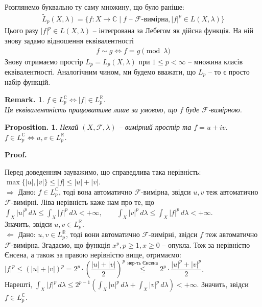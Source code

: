 \documentclass[a4paper, 10pt]{article}
\makeatletter
\def\rightproof{$\boxed{\Rightarrow}$ }
\def\leftproof{$\boxed{\Leftarrow}$ }
\theoremstyle{theoremdd}
\newtheorem*{proposition*}{Proposition.}
\newtheorem*{remark*}{Remark.}
\renewenvironment{proof}[1][Proof.\\]{\par
\pushQED{\hfill \qed}%
\normalfont \topsep6\p@\@plus6\p@\relax
\trivlist
\item\relax
{\bfseries
#1\@addpunct{.}}\hspace\labelsep\ignorespaces
}{%
\popQED\endtrivlist\@endpefalse
}
\makeatother
\begin{document}
\noindent Розглянемо буквально ту саму множину, що було раніше:
\begin{align*}
\tilde{L}_p(X,\lambda) = \{f \colon X \to \mathbb{C} \mid f \text{ -- } \mathcal{F}\text{-вимірна}, |f|^p \in L(X,\lambda)\}
\end{align*}
Цього разу $|f|^p \in L(X,\lambda)$ -- інтегрована за Лебегом як дійсна функція. На ній знову задамо відношення еквівалентності
\begin{align*}
f \sim g \iff f = g \pmod \lambda
\end{align*}
Знову отримаємо простір $L_p = L_p(X,\lambda)$ при $1 \leq p < \infty$ -- множина класів еквівалентності. Аналогічним чином, ми будемо вважати, що $L_p$ -- то є просто набір функцій.

\begin{remark*}
$f \in L_p^{\mathbb{C}} \iff |f| \in L_p^{\mathbb{R}}$.\\
Ця еквівалентність працюватиме лише за умовою, що $f$ буде $\mathcal{F}$-вимірною.
\end{remark*}

\begin{proposition*}
Нехай $(X,\mathcal{F},\lambda)$ -- вимірний простір та $f = u + iv$.\\
$f \in L_p^{\mathbb{C}} \iff u,v \in L_p^{\mathbb{R}}$.
\end{proposition*}

\begin{proof}
Перед доведенням зауважимо, що справедлива така нерівність: $\max\{|u|,|v|\} \leq |f| \leq |u| + |v|$.
\bigskip \\
\rightproof Дано: $f \in L_p^{\mathbb{C}}$, тоді вона автоматично $\mathcal{F}$-вимірна, звідси $u,v$ теж автоматично $\mathcal{F}$-вимірні. Ліва нерівність каже нам про те, що\\
$\displaystyle\int_X |u|^p\,d\lambda \leq \int_X |f|^p\,d\lambda < +\infty, \qquad \int_X |v|^p\,d\lambda \leq \int_X |f|^p\,d\lambda < +\infty$.\\
Значить, звідси $u,v \in L_p^{\mathbb{R}}$.
\bigskip \\
\leftproof Дано: $u,v \in L_p^{\mathbb{R}}$, тоді вони автоматично $\mathcal{F}$-вимірні, звідси $f$ теж автоматично $\mathcal{F}$-вимірна. Згадаємо, що функція $x^p, p \geq 1,x \geq 0$ -- опукла. Тож за нерівністю Єнсена, а також за правою нерівністю вище, отримаємо:\\
$|f|^p \leq (|u| + |v|)^p = 2^p \cdot \left( \dfrac{|u| + |v|}{2} \right)^p \overset{\text{нер-ть Єнсена}}{\leq} 2^p \cdot \dfrac{|u|^p + |v|^p}{2}$.\\
Нарешті, $\displaystyle\int_X |f|^p\,d\lambda \leq 2^{p-1} \left( \int_X |u|^p\,d\lambda + \int_X |v|^p\,d\lambda \right) < +\infty$. Значить, звідси $f \in L_p^{\mathbb{C}}$.
\end{proof}
\end{document}
